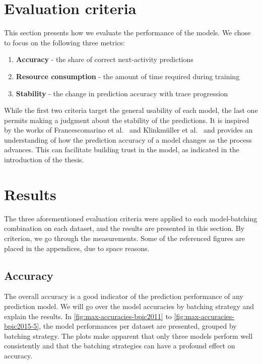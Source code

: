 \section{Evaluation criteria}\label{sec:eval:criteria}
This section presents how we evaluate the performance of the models. We chose to focus on the following three metrics:

\begin{enumerate}
    \item\textbf{Accuracy} - the share of correct next-activity predictions
    \item\textbf{Resource consumption} - the amount of time required during training
    \item\textbf{Stability} - the change in prediction accuracy with trace progression
\end{enumerate}

While the first two criteria target the general usability of each model, the last one permits making a judgment about the stability of the predictions. It is inspired by the works of Francescomarino et al.~\cite{francescomarino2015} and Klinkmüller et al.~\cite{klinkmuller2018reliablemonitoring} and provides an understanding of how the prediction accuracy of a model changes as the process advances. This can facilitate building trust in the model, as indicated in the introduction of the thesis.

\section{Results}\label{sec:eval:results}
The three aforementioned evaluation criteria were applied to each model-batching combination on each dataset, and the results are presented in this section. By criterion, we go through the measurements. Some of the referenced figures are placed in the appendices, due to space reasons.

\subsection*{Accuracy}
The overall accuracy is a good indicator of the prediction performance of any prediction model. We will go over the model accuracies by batching strategy and explain the results. In \autoref{fig:max-accuracies-bpic2011} to \autoref{fig:max-accuracies-bpic2015-5}, the model performances per dataset are presented, grouped by batching strategy. The plots make apparent that only three models perform well consistently and that the batching strategies can have a profound effect on accuracy.\\

